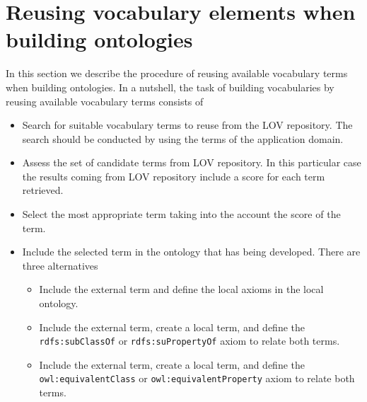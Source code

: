 
\vspace{-3mm}
\section{Reusing vocabulary elements when building ontologies}\label{sec:reuse}
In this section we describe the procedure of reusing available vocabulary terms when building ontologies. In a nutshell, the task of building vocabularies by reusing available vocabulary terms consists of
\vspace{-1mm}
\begin{itemize}
	\vspace{-1mm}\item Search for suitable vocabulary terms to reuse from the LOV repository. The search should be conducted by using the terms of the application domain.
	\vspace{-1mm}\item Assess the set of candidate terms from LOV repository. In this particular case the results coming from LOV repository include a score for each term retrieved.
	\vspace{-1mm}\item Select the most appropriate term taking into the account the score of the term.
	\vspace{-1mm}\item Include the selected term in the ontology that has being developed. There are three alternatives 
	\begin{itemize}
		\vspace{-1mm}\item Include the external term and define the local axioms in the local ontology.
		\vspace{-1mm}\item Include the external term, create a local term, and define the {\tt rdfs:subClassOf} or {\tt rdfs:suPropertyOf} axiom to relate both terms.
		\vspace{-1mm}\item Include the external term, create a local term, and define the {\tt owl:equivalentClass} or {\tt owl:equivalentProperty} axiom to relate both terms. 				
	\end{itemize}
\end{itemize}

